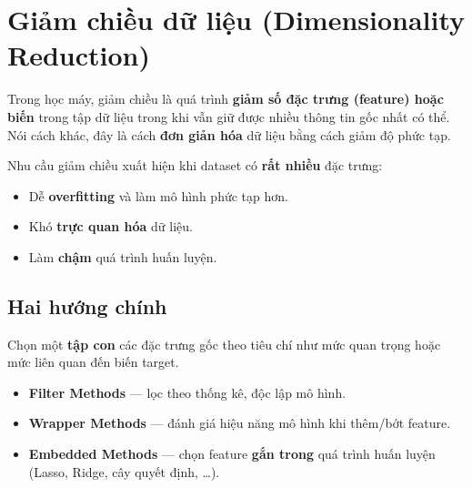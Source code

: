 \section{Giảm chiều dữ liệu (Dimensionality Reduction)}
\label{sec:dimensionality-reduction}

\begin{dinhnghia}[title={Giảm chiều dữ liệu}]
Trong học máy, giảm chiều là quá trình \textbf{giảm số đặc trưng (feature) hoặc biến} trong tập dữ liệu trong khi vẫn giữ được nhiều thông tin gốc nhất có thể. Nói cách khác, đây là cách \textbf{đơn giản hóa} dữ liệu bằng cách giảm độ phức tạp.
\end{dinhnghia}

\begin{dongco}[title={Khi nào cần giảm chiều?}]
Nhu cầu giảm chiều xuất hiện khi dataset có \textbf{rất nhiều} đặc trưng:
\begin{itemize}
  \item Dễ \textbf{overfitting} và làm mô hình phức tạp hơn.
  \item Khó \textbf{trực quan hóa} dữ liệu.
  \item Làm \textbf{chậm} quá trình huấn luyện.
\end{itemize}
\end{dongco}

\subsection{Hai hướng chính}

\begin{phuongphap}[title={Lựa chọn đặc trưng (Feature Selection)}]
Chọn một \textbf{tập con} các đặc trưng gốc theo tiêu chí như mức quan trọng hoặc mức liên quan đến biến target.
\end{phuongphap}

\begin{ynghia}[title={Các kỹ thuật lựa chọn đặc trưng phổ biến}]
\begin{itemize}
  \item \textbf{Filter Methods} --- lọc theo thống kê, độc lập mô hình.
  \item \textbf{Wrapper Methods} --- đánh giá hiệu năng mô hình khi thêm/bớt feature.
  \item \textbf{Embedded Methods} --- chọn feature \textbf{gắn trong} quá trình huấn luyện (Lasso, Ridge, cây quyết định, \ldots).
\end{itemize}
\end{ynghia}

